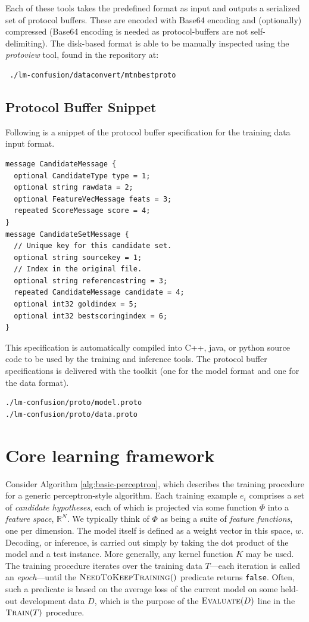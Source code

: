\documentclass[a4paper]{article}
\begin{document}
Each of these tools takes the predefined format as input and outputs a
serialized set of protocol buffers.  These are encoded with Base64 encoding and
(optionally) compressed (Base64 encoding is needed as protocol-buffers are not
self-delimiting).  The disk-based format is able to be manually inspected using
the \emph{protoview} tool, found in the repository at:
 \begin{verbatim} ./lm-confusion/dataconvert/mtnbestproto \end{verbatim}

\subsection{Protocol Buffer Snippet}

Following is a snippet of the protocol buffer specification for the
training data input format.
\scriptsize
\begin{verbatim}
message CandidateMessage {
  optional CandidateType type = 1;
  optional string rawdata = 2;
  optional FeatureVecMessage feats = 3;
  repeated ScoreMessage score = 4;
}
message CandidateSetMessage {
  // Unique key for this candidate set.
  optional string sourcekey = 1;
  // Index in the original file.
  optional string referencestring = 3;
  repeated CandidateMessage candidate = 4;
  optional int32 goldindex = 5;
  optional int32 bestscoringindex = 6;
}
\end{verbatim}
\normalsize

This specification is automatically compiled into C++, java, or python source code to be
used by the training and inference tools.  The protocol buffer specifications is
delivered with the toolkit (one for the model format and one for the data
format).
\begin{verbatim}
./lm-confusion/proto/model.proto
./lm-confusion/proto/data.proto
\end{verbatim}


\section{Core learning framework}

Consider Algorithm \ref{alg:basic-perceptron}, which describes the
training procedure for a generic perceptron-style algorithm. Each
training example $e_{i}$ comprises a set of \emph{candidate hypotheses},
each of which is projected via some function $\Phi$ into a \emph{feature
space}, $\mathbb{R}^{N}$. We typically think of $\Phi$ as being
a suite of \emph{feature functions}, one per dimension.\emph{ }The\emph{
}model itself is defined as a weight vector in this space, $w$. Decoding,
or inference, is carried out simply by taking the dot product of the
model and a test instance. More generally, any kernel function $K$
may be used. The training procedure iterates over the training data
$T$---each iteration is called an \emph{epoch}---until the $\Call{NeedToKeepTraining}{}()$
predicate returns \texttt{false}. Often, such a predicate is based
on the average loss of the current model on some held-out development
data $D$, which is the purpose of the $\Call{Evaluate}{D}$ line
in the $\Call{Train}{T}$ procedure.
\end{document}
